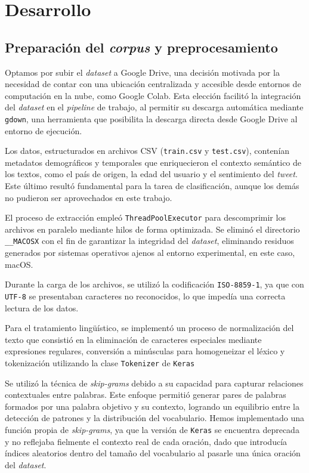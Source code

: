 \section {Desarrollo}

\subsection{Preparación del \textit{corpus} y preprocesamiento}

Optamos por subir el \textit{dataset} a Google Drive, una decisión motivada por la necesidad de contar con una 
ubicación centralizada y accesible desde entornos de computación en la nube, como Google Colab. Esta elección 
facilitó la integración del \textit{dataset} en el \textit{pipeline} de trabajo, al permitir su descarga automática 
mediante \texttt{gdown}, una herramienta que posibilita la descarga directa desde Google Drive al entorno de ejecución.

Los datos, estructurados en archivos CSV (\texttt{train.csv} y \texttt{test.csv}), contenían metadatos demográficos 
y temporales que enriquecieron el contexto semántico de los textos, como el país de origen, la edad del usuario y 
el sentimiento del \textit{tweet}. Este último resultó fundamental para la tarea de clasificación, aunque los demás 
no pudieron ser aprovechados en este trabajo.

El proceso de extracción empleó \texttt{ThreadPoolExecutor} para descomprimir los archivos en paralelo mediante 
hilos de forma optimizada. Se eliminó el directorio \texttt{\_\_MACOSX} con el fin de garantizar la integridad del 
\textit{dataset}, eliminando residuos generados por sistemas operativos ajenos al entorno experimental, en este caso,
macOS. 

Durante la carga de los archivos, se utilizó la codificación \texttt{ISO-8859-1}, ya que con \texttt{UTF-8} se 
presentaban caracteres no reconocidos, lo que impedía una correcta lectura de los datos.

Para el tratamiento lingüístico, se implementó un proceso de normalización del texto que consistió en la eliminación de 
caracteres especiales mediante expresiones regulares, conversión a minúsculas para homogeneizar el léxico y tokenización 
utilizando la clase \texttt{Tokenizer} de \texttt{Keras}

Se utilizó la técnica de \textit{skip-grams} debido a su capacidad para capturar relaciones contextuales entre palabras. Este enfoque permitió generar 
pares de palabras formados por una palabra objetivo y su contexto, logrando un equilibrio entre la detección de patrones y la distribución del 
vocabulario. Hemos implementado una función propia de \textit{skip-grams}, ya que la versión de \texttt{Keras} se encuentra deprecada y no reflejaba 
fielmente el contexto real de cada oración, dado que introducía índices aleatorios dentro del tamaño del vocabulario al pasarle una única oración 
del \textit{dataset}.

